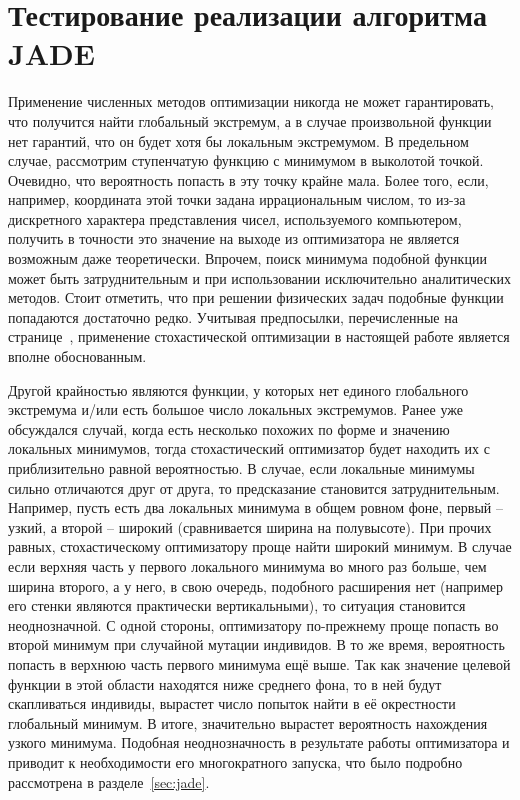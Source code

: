 \section{Тестирование реализации алгоритма JADE}
\label{sec:test-jade}
Применение численных методов оптимизации никогда не может
гарантировать, что получится найти глобальный экстремум, а в случае
произвольной функции нет гарантий, что он будет  хотя бы
локальным экстремумом.  В предельном случае, рассмотрим ступенчатую
функцию с минимумом в выколотой точкой.  Очевидно, что вероятность
попасть в эту точку крайне мала.  Более того, если, например,
координата этой точки задана иррациональным числом, то из-за
дискретного характера представления чисел, используемого компьютером, получить в
точности это значение на выходе из оптимизатора не является возможным
даже теоретически.  Впрочем, поиск минимума подобной функции может
быть затруднительным и при использовании исключительно аналитических
методов.  Стоит отметить, что при решении физических задач подобные
функции попадаются достаточно редко.  Учитывая предпосылки,
перечисленные на странице~\pageref{ref:why-jade}, применение
стохастической оптимизации в настоящей работе является вполне
обоснованным.

Другой крайностью являются функции, у которых нет единого глобального
экстремума и/или есть большое число локальных экстремумов.  Ранее уже
обсуждался случай, когда есть несколько похожих по форме и значению
локальных минимумов, тогда стохастический оптимизатор будет находить
их с приблизительно равной вероятностью.  В случае, если локальные
минимумы сильно отличаются друг от друга, то предсказание становится
затруднительным.  Например, пусть есть два локальных минимума в общем
ровном фоне, первый -- узкий, а второй -- широкий (сравнивается ширина
на полувысоте). При прочих равных, стохастическому оптимизатору проще
найти широкий минимум. В случае если верхняя часть у первого
локального минимума во много раз больше, чем ширина второго, а у
него, в свою очередь, подобного расширения нет (например его стенки
являются практически вертикальными), то ситуация становится
неоднозначной.  С одной стороны, оптимизатору по-прежнему проще
попасть во второй минимум при случайной мутации индивидов. В то же
время, вероятность попасть в верхнюю часть первого минимума ещё
выше. Так как значение целевой функции в этой области находятся ниже
среднего фона, то в ней будут скапливаться индивиды, вырастет число
попыток найти в её окрестности глобальный минимум.  В итоге,
значительно вырастет вероятность нахождения узкого минимума.  Подобная
неоднозначность в результате работы оптимизатора и приводит к
необходимости его многократного запуска, что было подробно рассмотрена
в разделе~\ref{sec:jade}.

